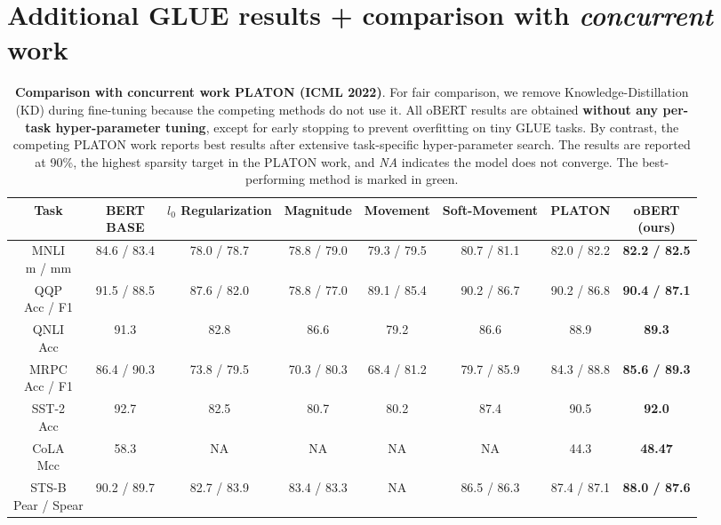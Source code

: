\documentclass[11pt]{article}
\begin{document}
\section{Additional GLUE results + comparison with \emph{concurrent} work}
\begin{table}[h!]
    \caption{
    \textbf{Comparison with concurrent work PLATON (ICML 2022)}. 
    For fair comparison, we remove Knowledge-Distillation (KD) during fine-tuning because the competing methods do not use it. 
    All oBERT results are obtained \textbf{without any per-task hyper-parameter tuning}, except for early stopping to prevent overfitting on tiny GLUE tasks. 
    By contrast, the competing PLATON work reports best results after extensive task-specific hyper-parameter search. The results are reported at 90\%, the highest sparsity target in the PLATON work, and \textit{NA} indicates the model does not converge. The best-performing method is marked in green.}
    \centering
    {\small
    \begin{tabular}{cc|cccccc}
    \toprule 
    Task & \makecell{BERT\\{\scriptsize BASE}} & $l_0$ Regularization & Magnitude & Movement & Soft-Movement & PLATON & \makecell{oBERT\\(ours)} \\
    \midrule
    \makecell{MNLI\\m / mm} & 84.6 / 83.4 & 78.0 / 78.7 & 78.8 / 79.0 & 79.3 / 79.5 & 80.7 / 81.1 & 82.0 / 82.2 & \cellcolor{green!25}\textbf{82.2 / 82.5} \\
    \midrule
    \makecell{QQP\\Acc / F1} & 91.5 / 88.5 & 87.6 / 82.0 & 78.8 / 77.0 & 89.1 / 85.4 & 90.2 / 86.7 & 90.2 / 86.8 & \cellcolor{green!25}\textbf{90.4 / 87.1} \\ 
    \midrule
    \makecell{QNLI\\Acc} & 91.3 & 82.8 & 86.6 & 79.2 & 86.6 & 88.9 & \cellcolor{green!25}\textbf{89.3} \\ 
    \midrule
    \makecell{MRPC\\Acc / F1} & 86.4 / 90.3 & 73.8 / 79.5 & 70.3 / 80.3 & 68.4 / 81.2 & 79.7 / 85.9 & 84.3 / 88.8 & \cellcolor{green!25}\textbf{85.6 / 89.3} \\ 
    \midrule
    \makecell{SST-2\\Acc} & 92.7 & 82.5 & 80.7 & 80.2 & 87.4 & 90.5 & \cellcolor{green!25}\textbf{92.0} \\
    \midrule
    \makecell{CoLA\\Mcc} & 58.3 & NA & NA & NA & NA & 44.3 & \cellcolor{green!25}\textbf{48.47} \\
    \midrule
    \makecell{STS-B\\Pear / Spear} & 90.2 / 89.7 & 82.7 / 83.9 & 83.4 / 83.3 & NA & 86.5 / 86.3 & 87.4 / 87.1 & \cellcolor{green!25}\textbf{88.0 / 87.6} \\
    \bottomrule
    \end{tabular}
    }
\end{table}
\end{document}
